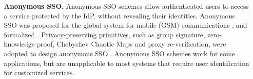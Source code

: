 %

\noindent\textbf{Anonymous SSO.}
Anonymous SSO schemes allow authenticated users to access a service protected by the IdP,
    without revealing their identities.
Anonymous SSO was proposed for the global system for mobile (GSM) communications \cite{ElmuftiWRR08},
    and formalized \cite{WangWS13}.
Privacy-preserving primitives, such as group signature, zero-knowledge proof, Chebyshev Chaotic Maps and proxy re-verification,
     were adopted to design anonymous SSO \cite{WangWS13,HanCSTW18,Lee18,HanCSTWW20}.
Anonymous SSO schemes work for some applications,
    but are unapplicable to most systems that require user identification for customized services.

